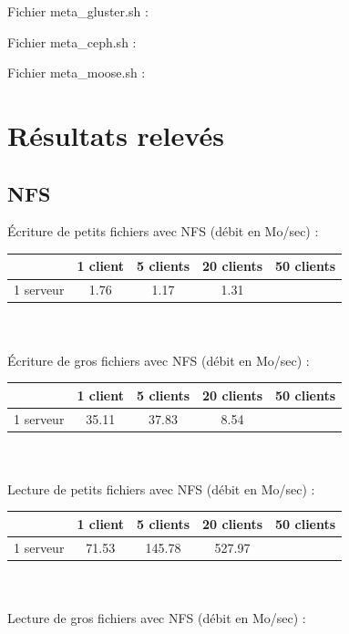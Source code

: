 \documentclass[12pt]{report}
\begin{document}
				Fichier meta\_gluster.sh :
				

				Fichier meta\_ceph.sh :
				

				Fichier meta\_moose.sh :
				

		\chapter{Résultats relevés}

			\section{NFS}

			Écriture de petits fichiers avec NFS (débit en Mo/sec) :

			\begin{tabular}{|l|c|c|c|c|}
				\hline
				& 1 client & 5 clients & 20 clients & 50 clients \\
				\hline
				1 serveur & 1.76 & 1.17 & 1.31 & \\
				\hline
			\end{tabular}\\\\

			Écriture de gros fichiers avec NFS (débit en Mo/sec) :

			\begin{tabular}{|l|c|c|c|c|}
				\hline
				& 1 client & 5 clients & 20 clients & 50 clients \\
				\hline
				1 serveur & 35.11 & 37.83 & 8.54 & \\
				\hline
			\end{tabular}\\\\

			Lecture de petits fichiers avec NFS (débit en Mo/sec) :

			\begin{tabular}{|l|c|c|c|c|}
				\hline
				& 1 client & 5 clients & 20 clients & 50 clients \\
				\hline
				 1 serveur & 71.53 & 145.78 & 527.97 & \\
				\hline
			\end{tabular}\\\\

			Lecture de gros fichiers avec NFS (débit en Mo/sec) :
\end{document}
